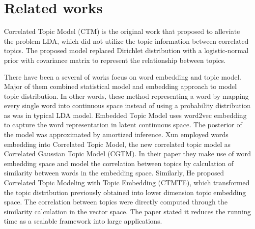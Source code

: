\section{Related works}
Correlated Topic Model (CTM)\cite{blei_correlated_2007} is the original work that proposed to alleviate the problem LDA, which did not utilize the topic information between correlated topics. The proposed model replaced Dirichlet distribution with a logistic-normal prior with covariance matrix to represent the relationship between topics.

There have been a several of works focus on word embedding and topic model. Major of them combined statistical model and embedding approach to model topic distribution. In other words, these method representing a word by mapping every single word into continuous space instead of using a probability distribution as was in typical LDA model.
Embedded Topic Model\cite{dieng_topic_2019} uses word2vec embedding to capture the word representation in latent continuous space. The posterior of the model was approximated by amortized inference.
Xun \cite{xun_correlated_2017} employed words embedding into Correlated Topic Model, the new correlated topic model as Correlated Gaussian Topic Model (CGTM). In their paper they make use of word embedding space and model the correlation between topics by calculation of similarity between words in the embedding space.
Similarly, He\cite{he_efficient_2017} proposed Correlated Topic Modeling with Topic Embedding (CTMTE), which transformed the topic distribution previously obtained into lower dimension topic embedding space. The correlation between topics were directly computed through the similarity calculation in the vector space. The paper stated it reduces the running time as a scalable framework into large applications.
